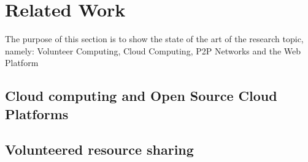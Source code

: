 \documentclass{./llncs2e/llncs}
\begin{document}
% 
% 

\section{Related Work}
The purpose of this section is to show the state of the art of the research topic, namely: Volunteer Computing, Cloud Computing, P2P Networks and the Web Platform

% 
% 
\subsection{Cloud computing and Open Source Cloud Platforms}
%  














% 
% 
\subsection{Volunteered resource sharing}



% 
        

                  
\end{document}
